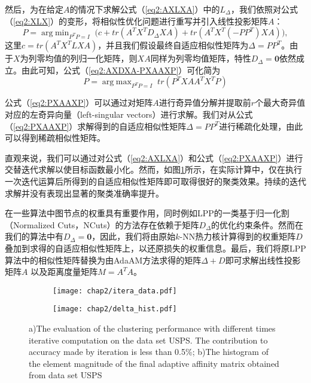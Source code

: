 然后，为在给定$A$的情况下求解公式（\ref{eq2:AXLXA}）中的$L_\Delta$，我们依照对公式（\ref{eq2:XLX}）的变形，将相似性优化问题进行重写并引入线性投影矩阵$A$：
\begin{equation}
		P = \mathop{\mathrm{arg\;min}}_{P^TP=I}\; \Big( c+tr(A^TX^TD_\Delta XA) 
		+tr(A^TX^T(-PP^T)XA)\Big),
	\label{eq2:AXDXA-PXAAXP}
\end{equation}
这里$c=tr(A^TX^TLXA)$，并且我们假设最终自适应相似性矩阵为$\Delta = PP^T$。由于$X$为列零均值的列归一化矩阵，则$XA$同样为列零均值矩阵，特性$D_\Delta = \textbf{0}$依然成立。由此可知，公式（\ref{eq2:AXDXA-PXAAXP}）可化简为
\begin{equation}
	P = \mathop{\mathrm{arg\;max}}_{P^TP=I}\; tr(P^TXAA^TX^TP)
	\label{eq2:PXAAXP}
\end{equation}

公式（\ref{eq2:PXAAXP}）可以通过对矩阵$A$进行奇异值分解并提取前$r$个最大奇异值对应的左奇异向量（left-singular vectors）进行求解。我们对从公式（\ref{eq2:PXAAXP}）求解得到的自适应相似性矩阵$\Delta=PP^T$进行稀疏化处理，由此可以得到稀疏相似性矩阵。

直观来说，我们可以通过对公式（\ref{eq2:AXLXA}）和公式（\ref{eq2:PXAAXP}）进行交替迭代求解以使目标函数最小化。然而，如图\ref{fig2:itera}所示，在实际计算中，仅在执行一次迭代运算后所得到的自适应相似性矩阵即可取得很好的聚类效果。持续的迭代求解并没有表现出显著的聚类准确率提升。

在一些算法中图节点的权重具有重要作用，同时例如LPP的一类基于归一化割（Normalized Cuts，NCuts）的方法存在依赖于矩阵$D_\Delta$的优化约束条件。然而在我们的算法中有$D_\Delta = \textbf{0}$，因此，我们将由原始$k$-NN热力核计算得到的权重矩阵$D$叠加到求得的自适应相似性矩阵上，以还原损失的权重信息。最后，我们将原LPP算法中的相似性矩阵替换为由AdaAM方法求得的矩阵$\Delta+D$即可求解出线性投影矩阵$A$ 以及距离度量矩阵$M = A^TA$。

\begin{figure}[t]
	\centering
	\begin{subfigure}{0.49\textwidth}
		\centering
		\texttt{[image: chap2/itera\_data.pdf]}
		\caption{}
		\label{fig2:itera}
	\end{subfigure}
	\begin{subfigure}{0.49\textwidth}
		\centering
		\texttt{[image: chap2/delta\_hist.pdf]}
		\caption{}
		\label{fig2:Hist}
	\end{subfigure}
			  {a)The evaluation of the clustering performance with different times iterative computation on the data set USPS. The contribution to accuracy made by iteration is less than 0.5\%; b)The histogram of the element magnitude of the final adaptive affinity matrix obtained from data set USPS}
\end{figure}

